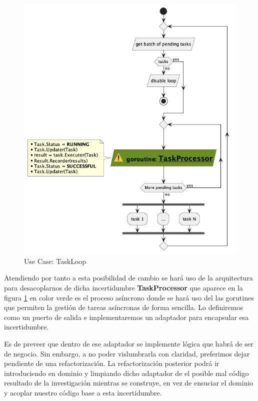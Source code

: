 \begin{figure}[H]
    \centering
    \includegraphics[height=0.3\textheight]{./part/Proyecto_ejecutivo/memoria_descriptiva/descripcionDelProyecto/manager/uml/executeTaskLoop}
    \caption{Use Case: TaskLoop}\label{fig:Use Case-TaskLoop}
\end{figure}

Atendiendo por tanto a esta posibilidad de cambio se hará uso de la arquitectura para desacoplarnos de dicha incertidumbre \textbf{TaskProcessor} que aparece en la figura \ref{fig:Use Case-TaskLoop} en color verde es el proceso asíncrono donde se hará uso del las gorutines que permiten la gestión de tareas asíncronas de forma sencilla. Lo definiremos como un puerto de salida e implementaremos un adaptador para encapsular esa incertidumbre.

Es de preveer que dentro de ese adaptador se implemente lógica que habrá de ser de negocio. Sin embargo, a no poder vislumbrarla con claridad, preferimos dejar pendiente de una refactorización. La refactorización posterior podrá ir introduciendo en dominio y limpiando dicho adaptador de el posible mal código resultado de la investigación mientras se construye, en vez de ensuciar el dominio y acoplar nuestro código base a esta incertidumbre.

